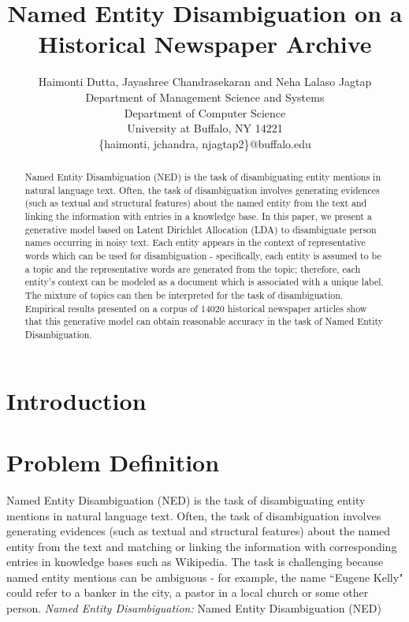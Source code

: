 \documentclass[letterpaper]{article} %
\begin{document}
%
\title{Named Entity Disambiguation on a Historical Newspaper Archive}
\author{  Haimonti Dutta, Jayashree Chandrasekaran and Neha Lalaso Jagtap\\
Department of Management Science and Systems\\
Department of Computer Science \\
University at Buffalo, NY 14221\\
\{haimonti, jchandra, njagtap2\}@buffalo.edu\\
}
\maketitle
\begin{abstract}
Named Entity Disambiguation (NED) is the task of disambiguating entity mentions in natural language text. Often, the task of disambiguation involves generating evidences (such as textual and structural features) about the named entity from the text and linking the information with entries in a knowledge base. In this paper, we present a generative model based on Latent Dirichlet Allocation (LDA) to disambiguate person names occurring in noisy text. Each entity appears in the context of representative words which can be used for disambiguation -  specifically, each entity is assumed to be a topic and the representative words are generated from the topic; therefore, each entity's context can be modeled as a document which is associated with a unique label. The mixture of topics can then be interpreted for the task of disambiguation. Empirical results presented on a corpus of 14020 historical newspaper articles show that this generative model can obtain reasonable accuracy in the task of Named Entity Disambiguation. 
\end{abstract}


\section{Introduction}



\section{Problem Definition}

Named Entity Disambiguation (NED) is the task of disambiguating entity mentions in natural language text. Often, the task of disambiguation involves generating evidences (such as textual and structural features) about the named entity from the text and matching or linking the information with corresponding entries in knowledge bases such as Wikipedia. The task is challenging because named entity mentions can be ambiguous - for example, the name ``Eugene Kelly" could refer to a banker in the city, a pastor in a local church or some other person.  
\emph{Named Entity Disambiguation: } Named Entity Disambiguation (NED) 
\end{document}
